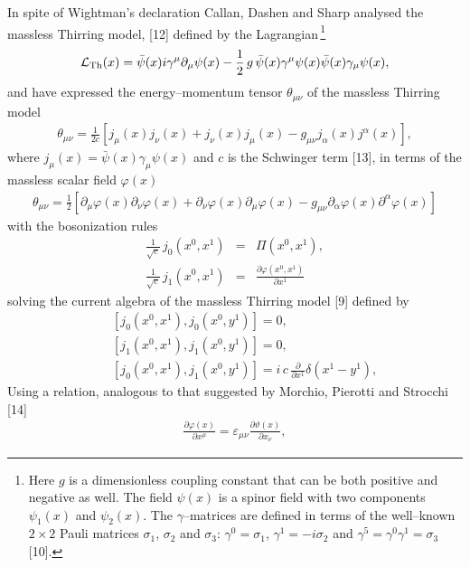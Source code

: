 \documentclass[a4paper,12pt] {article}
\begin{document}
In spite of Wightman's declaration Callan, Dashen and Sharp analysed
the massless Thirring model, [12] defined by the
Lagrangian\,\footnote{Here $g$ is a dimensionless coupling constant
that can be both positive and negative as well. The field $\psi(x)$ is
a spinor field with two components $\psi_1(x)$ and $\psi_2(x)$. The
$\gamma$--matrices are defined in terms of the well--known $2\times 2$
Pauli matrices $\sigma_1$, $\sigma_2$ and $\sigma_3$: $\gamma^0 =
\sigma_1$, $\gamma^1 = - i\sigma_2$ and $\gamma^5 = \gamma^0\gamma^1 =
\sigma_3$ [10].}
%
\begin{eqnarray}\label{label1.15}
{\cal L}_{\rm Th}(x) = \bar{\psi}(x)i\gamma^{\mu}\partial_{\mu}\psi(x) -
\frac{1}{2}\,g\,\bar{\psi}(x)\gamma^{\mu}\psi(x)\bar{\psi}(x)
\gamma_{\mu}\psi(x),
\end{eqnarray}
%
and have expressed the energy--momentum tensor $\theta_{\mu\nu}$ of
the massless Thirring model
%
\begin{eqnarray}\label{label1.16} 
\theta_{\mu\nu} = \frac{1}{2c}[j_{\mu}(x)j_{\nu}(x) +
j_{\nu}(x)j_{\mu}(x) - g_{\mu\nu}j_{\alpha}(x)j^{\alpha}(x)],
\end{eqnarray}
%
where $j_{\mu}(x) = \bar{\psi}(x)\gamma_{\mu}\psi(x)$ and $c$ is the
Schwinger term [13], in terms of the massless scalar field $\varphi(x)$
%
\begin{eqnarray}\label{label1.17}
\theta_{\mu\nu} =
\frac{1}{2}[\partial_{\mu}\varphi(x)\partial_{\nu}\varphi(x) +
\partial_{\nu}\varphi(x)\partial_{\mu}\varphi(x) -
g_{\mu\nu}\partial_{\alpha}\varphi(x)\partial^{\alpha}\varphi(x)]
\end{eqnarray}
%
with the bosonization rules
%
\begin{eqnarray}\label{label1.18}
\frac{1}{\sqrt{c}}\,j_0(x^0, x^1) &=& \Pi(x^0,x^1),\nonumber\\
\frac{1}{\sqrt{c}}\,j_1(x^0, x^1) &=& \frac{\partial \varphi(x^0,
x^1)}{\partial x^1}
\end{eqnarray}
%
solving the current algebra of the massless Thirring model [9] defined
by
%
\begin{eqnarray}\label{label1.19}
&&[j_0(x^0, x^1), j_0(x^0, y^1)] = 0,\nonumber\\ &&[j_1(x^0, x^1),
j_1(x^0, y^1)] = 0,\nonumber\\ &&[j_0(x^0, x^1), j_1(x^0, y^1)] =
i\,c\,\frac{\partial}{\partial x^1}\delta(x^1 - y^1),
\end{eqnarray}
%
Using a relation, analogous to that suggested by Morchio, Pierotti and
Strocchi [14]
%
\begin{eqnarray}\label{label1.20}
\frac{\partial \varphi(x)}{\partial x^{\mu}}
= \varepsilon_{\mu\nu}\frac{\partial \vartheta(x)}{\partial x_{\nu}},
\end{eqnarray}
\end{document}
